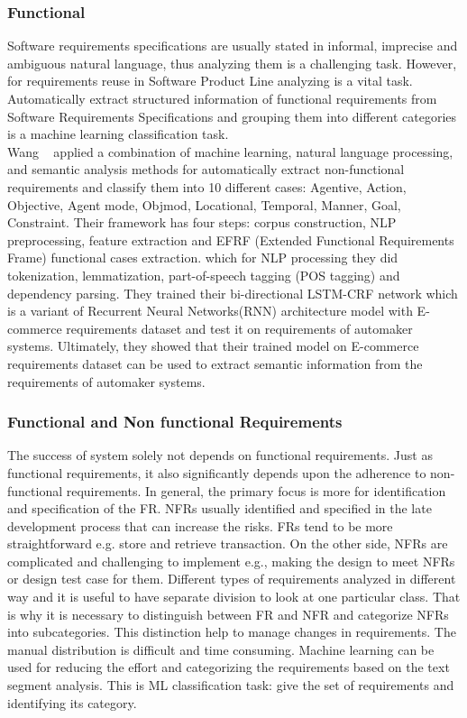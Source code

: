 \subsubsection{Functional}

Software requirements specifications are usually stated in informal, imprecise
and ambiguous natural language, thus analyzing them is a challenging task.
However, for requirements reuse in Software Product Line analyzing is a vital
task. Automatically extract structured information of functional requirements
from Software Requirements Specifications and grouping them into different
categories is a machine learning classification task\cite{7949577}. \\

Wang \etal~\cite{7949577} applied a combination of machine learning, natural
language processing, and semantic analysis methods for automatically extract
non-functional requirements and classify
them into 10 different cases: Agentive, Action, Objective, Agent mode, Objmod, Locational, Temporal, Manner, Goal,
Constraint. Their framework has four steps: corpus construction,  NLP 
preprocessing, feature extraction and  EFRF (Extended Functional Requirements
Frame) functional cases extraction. which for NLP processing they did
tokenization,   lemmatization, part-of-speech tagging (POS  tagging) and
dependency parsing. They trained their bi-directional LSTM-CRF network which is
a variant of Recurrent Neural Networks(RNN) architecture model with E-commerce
requirements dataset and test it on requirements of automaker systems.
Ultimately, they showed that their trained model on E-commerce requirements
dataset can be used to extract semantic information from the requirements of
automaker systems.

\subsubsection{Functional and Non functional Requirements}

The success of system solely not depends on functional requirements. Just as
functional requirements, it also significantly depends upon the adherence to
non-functional requirements. In general, the primary focus is more for
identification and specification of the FR.  NFRs usually identified and
specified in the late development process that can increase the risks. FRs tend
to be more straightforward e.g. store and retrieve transaction. On the other
side, NFRs are complicated and challenging to implement e.g., making the design
to meet NFRs or design test case for them. Different types of requirements
analyzed in different way and it is useful to have separate division to look at
one particular class. That is why it is necessary to distinguish between FR and
NFR and categorize NFRs into subcategories. This distinction help to manage
changes in requirements. The manual distribution is difficult and time
consuming. Machine learning can be used for reducing the effort and categorizing
the requirements based on the text segment analysis. This is ML classification
task: give the set of requirements and identifying its category. \\

